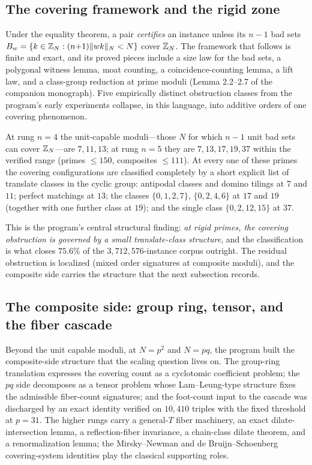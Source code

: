 \subsection{The covering framework and the rigid zone}

Under the equality theorem, a pair \emph{certifies} an instance unless
its $n-1$ bad sets $B_w=\{k\in\mathbb{Z}_N:(n{+}1)\lVert wk \rVert_{N}<N\}$ cover $\mathbb{Z}_N$.
The framework that follows is finite and exact, and its proved pieces
include a size law for the bad sets, a polygonal witness lemma, moat
counting, a coincidence-counting lemma, a lift law, and a class-group
reduction at prime moduli (Lemma 2.2--2.7 of the companion
monograph). Five empirically distinct obstruction classes from the
program's early experiments collapse, in this language, into additive
orders of one covering phenomenon.

\begin{theorem}\label{thm:rigid}
At rung $n=4$ the unit-capable moduli---those $N$ for which $n-1$ unit
bad sets can cover $\mathbb{Z}_N$---are $7,11,13$; at rung $n=5$ they are
$7,13,17,19,37$ within the verified range (primes $\le150$, composites
$\le111$). At every one of these primes the covering configurations are
classified completely by a short explicit list of translate classes in
the cyclic group: antipodal classes and domino tilings at $7$ and $11$;
perfect matchings at $13$; the classes $\{0,1,2,7\}$, $\{0,2,4,6\}$ at
$17$ and $19$ (together with one further class at $19$); and the single
class $\{0,2,12,15\}$ at $37$.
\end{theorem}

This is the program's central structural finding: \emph{at rigid primes,
the covering obstruction is governed by a small translate-class
structure}, and the classification is what closes $75.6\%$ of the
$3{,}712{,}576$-instance corpus outright. The residual obstruction is
localized (mixed order signatures at composite moduli), and the composite
side carries the structure that the next subsection records.

\subsection{The composite side: group ring, tensor, and the fiber
cascade}

Beyond the unit capable moduli, at $N=p^2$ and $N=pq$, the program built
the composite-side structure that the scaling question lives on. The
group-ring translation expresses the covering count as a cyclotomic
coefficient problem; the $pq$ side decomposes as a tensor problem whose
Lam--Leung-type structure \cite{LamLeung} fixes the admissible
fiber-count signatures; and the foot-count input to the cascade was
discharged by an exact identity verified on $10{,}410$ triples with the
fixed threshold at $p=31$. The higher rungs carry a general-$T$ fiber
machinery, an exact dilate-intersection lemma, a reflection-fiber
invariance, a chain-class dilate theorem, and a renormalization lemma;
the Mirsky--Newman and de Bruijn--Schoenberg covering-system identities
\cite{MirskyNewman,deBruijnSchoenberg} play the classical supporting
roles.

